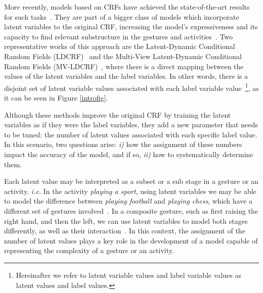 \documentclass[10pt, conference]{IEEEtran}
\begin{document}
More recently, models based on CRFs have achieved the state-of-the-art results for such tasks~\cite{mvldcrf,hucrf,vicente2016wacv}. 
They are part of a bigger class of models which incorporate latent variables to the original CRF, increasing the model's expressiveness and its capacity to find relevant substructure in the gestures and activities~\cite{hcrf,ldcrf,mvldcrf,hucrf}. 
Two representative works of this approach are the Latent-Dynamic Conditional Random Fields (LDCRF)~\cite{ldcrf} and the Multi-View Latent-Dynamic Conditional Random Fields (MV-LDCRF)~\cite{mvldcrf}, where there is a direct mapping between the values of the latent variables and the label variables. In other words, there is a disjoint set of latent variable values associated with each label variable value~\footnote{Hereinafter we refer to latent variable values and label variable values as latent values and label values.}, as it can be seen in Figure \ref{introfig}. 

Although these methods improve the original CRF by training the latent variables as if they were the label variables, 
they add a new parameter that needs to be tuned: the number of latent values associated with each specific label value.
In this scenario, two questions arise: 
\textit{i)} how the assignment of these numbers impact the accuracy of the model, and if so,
\textit{ii)} how to systematically determine them.


Each latent value may be interpreted as a subset or a sub stage in a gesture or an activity. \textit{i.e.}
In the activity \textit{playing a sport}, using latent variables we may be able to model the difference between \textit{playing football} and \textit{playing chess}, which have a different set of gestures involved~\cite{hucrf}.
In a composite gesture, such as first raising the right hand, and then the left, we can use latent variables to model both stages differently, as well as their interaction~\cite{ldcrf}.
In this context, the assignment of the number of latent values plays a key role in the development of a model capable of representing the complexity of a gesture or an activity.
\end{document}
